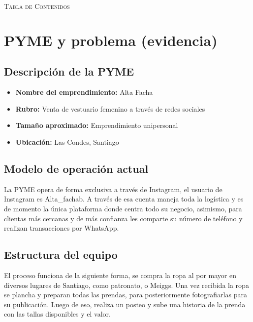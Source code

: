 \documentclass[11pt,letterpaper]{article}
\makeatletter
\def\tableofcontents{%
 \newpage
 \centerline{\large\scshape Tabla de Contenidos} 
 \vspace*{0.3in}
 \@mkboth{CONTENTS}{CONTENTS}
 \@starttoc{toc}
}
\makeatother
\begin{document}
\tableofcontents
\clearpage


\section{PYME y problema (evidencia)}
\subsection*{Descripción de la PYME}

\begin{itemize}
    \item \textbf{Nombre del emprendimiento:} Alta Facha
    \item \textbf{Rubro:} Venta de vestuario femenino a través de redes sociales
    \item \textbf{Tamaño aproximado:} Emprendimiento unipersonal
    \item \textbf{Ubicación:} Las Condes, Santiago
\end{itemize}

\subsection*{Modelo de operación actual}

La PYME opera de forma exclusiva a través de Instagram, el usuario de Instagram es Alta\_fachab. A través de esa cuenta maneja toda la logística y es de momento la única plataforma donde centra todo su negocio, asimismo, para clientas más cercanas y de más confianza les comparte su número de teléfono y realizan transacciones por WhatsApp. 

\subsection*{Estructura del equipo}

El proceso funciona de la siguiente forma, se compra la ropa al por mayor en diversos lugares de Santiago, como patronato, o Meiggs. Una vez recibida la ropa se plancha y preparan todas las prendas, para posteriormente fotografiarlas para su publicación. Luego de eso, realiza un posteo y sube una historia de la prenda con las tallas disponibles y el valor.  
\end{document}

